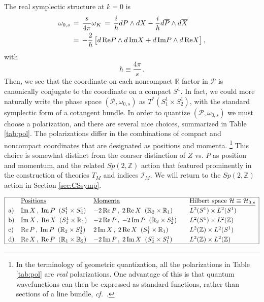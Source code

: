 \documentclass[11pt,letterpaper]{article}
\numberwithin{equation}{section}
\newcommand{\be}{\begin{equation}}
\newcommand{\ee}{\end{equation}}
\newcommand{\ol}{\overline}
\newcommand{\cf}{\emph{cf.}}
\newcommand{\Z}{{\mathbb Z}}
\newcommand{\R}{{\mathbb R}}
\renewcommand{\Re}{{\rm Re}}
\renewcommand{\Im}{{\rm Im}}
\newcommand{\CH}{\mathcal{H}}
\newcommand{\CI}{\mathcal{I}}
\newcommand{\CP}{\mathcal{P}}
\begin{document}
The real symplectic structure at $k=0$ is
%
\begin{align} \omega_{0,s} &\,=\,\frac{s}{4\pi}\omega_K \,=\, \frac{i}{\hbar} dP\wedge dX - \frac{i}\hbar d\ol P\wedge d\ol X \label{ws1}  \\
 &\,=\, -\frac{2}\hbar\,\big[ d\,\Re P\wedge d\,\Im X+d\,\Im P\wedge d\,\Re X\big]  \,, \label{ws2}
\end{align}
%
with
%
\be \boxed{\hbar \equiv \frac{4\pi}{s}}\,. \ee
%
Then, we see that the coordinate on each noncompact $\R$ factor in $\CP$ is canonically conjugate to the coordinate on a compact $S^1$. In fact, we could more naturally write the phase space $(\CP,\omega_{0,s})$ as $T^*(S^1_1\times S_2^1)$, with the standard symplectic form of a cotangent bundle. In order to quantize $(\CP,\omega_{0,s})$ we must choose a polarization, and there are several nice choices, summarized in Table \ref{tab:pol}. The polarizations differ in the combinations of compact and noncompact coordinates that are designated as positions and momenta.%
%
\footnote{In the terminology of geometric quantization, all the polarizations in Table \ref{tab:pol} are \emph{real} polarizations. One advantage of this is that quantum wavefunctions can then be expressed as standard functions, rather than sections of a line bundle, \cf\ \cite{Witten-cx}.} %
%
This choice is somewhat distinct from the coarser distinction of $Z$ vs. $P$ as position and momentum, and the related $Sp(2,\Z)$ action that featured prominently in the construction of theories $T_M$ and indices $\CI_M$. We will return to the $Sp(2,\Z)$ action in Section \ref{sec:CSsymp}.



\begin{table}[htb]
\centering
$\begin{array}{|@{\;\;}l@{\quad}l@{\quad}l@{\qquad}l@{\;\;}|} \hline
&\text{\underline{Positions}} & \text{\underline{Momenta}} & \text{\underline{Hilbert space $\CH\equiv \CH_{0,s}$}} \\[.1cm]
\text{a)} & \Im\, X\,,\;\Im\, P\;\;(S^1_1\times S^1_2) & -2\,\Re\, P\,,\;2\,\Re\, X\;\; (\R_2\times \R_1) & L^2(S^1)\times L^2(S^1) \\[.1cm]
\text{b)} & \Im\, X\,,\;\Re\, X\;\; (S^1_1\times \R_1) & -2\,\Re\, P\,,\;-2\,\Im\, P \;\;(\R_2\times S^1_2) & L^2(S^1)\times L^2(\Z) \\[.1cm]
\text{c)} & \Re\, P\,,\;\Im\, P\;\; (\R_2\times S^1_2) & 2\,\Im\, X\,,\;2\,\Re\, X \;\;(S^1_1\times \R_1) & L^2(\Z)\times L^2(S^1) \\[.1cm]
\text{d)} & \Re\, X\,,\;\Re\, P \;\;(\R_1\times \R_2) & -2\,\Im\, P\,,\; 2\,\Im\, X \;\;(S^1_2\times S^1_1) & L^2(\Z)\times L^2(\Z) \\\hline \end{array}$
\caption{Real polarizations and Hilbert spaces at $k=0$. All Hilbert spaces are isomorphic, and related by compact Fourier transform.}
\label{tab:pol}
\end{table}
\end{document}
